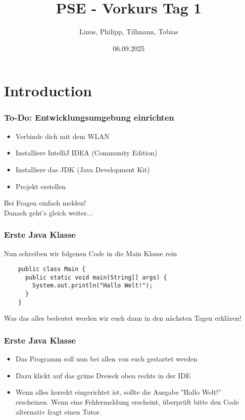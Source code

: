 \documentclass{../../presentation}
\title{PSE - Vorkurs Tag 1}
\author{Linus, Philipp, Tillmann, Tobias}
\institute{FIUS - Fachgruppe Informatik Universität Stuttgart}
\date{06.09.2025}
\begin{document}
\begin{frame}
  \titlepage
\end{frame}

\begin{frame}
  \listoftodos
\end{frame}

\section{Introduction}

\begin{frame}
    \frametitle{To-Do: Entwicklungsumgebung einrichten}
    
    \begin{itemize}
        \item Verbinde dich mit dem WLAN
        \item Installiere IntelliJ IDEA (Community Edition)
        \item Installiere das JDK (Java Development Kit)
        \item Projekt erstellen
    \end{itemize}
    \vfill
    \centering
    \Large
    Bei Fragen einfach melden! \\
    \vspace{0.5em}
    Danach geht's gleich weiter...
\end{frame}




\begin{frame}[fragile]
  \frametitle{Erste Java Klasse}
  Nun schreiben wir folgenen Code in die Main Klasse rein
  \begin{verbatim}
    public class Main {
      public static void main(String[] args) {
        System.out.println("Hallo Welt!");
      }
    }
  \end{verbatim}
  \achtung{} Was das alles bedeutet werden wir euch dann in den nächsten Tagen erklären!
\end{frame}

\begin{frame}
  \frametitle{Erste Java Klasse}
  \begin{itemize}
    \item Das Programm soll nun bei allen von euch gestartet werden
    \item Dazu klickt auf das grüne Dreieck oben rechts in der IDE
    \item Wenn alles korrekt eingerichtet ist, sollte die Ausgabe "Hallo Welt!'' erscheinen.
          \achtung{} Wenn eine Fehlermeldung erscheint, überprüft bitte den Code alternativ fragt einen Tutor.
  \end{itemize}
\end{frame}
\end{document}
